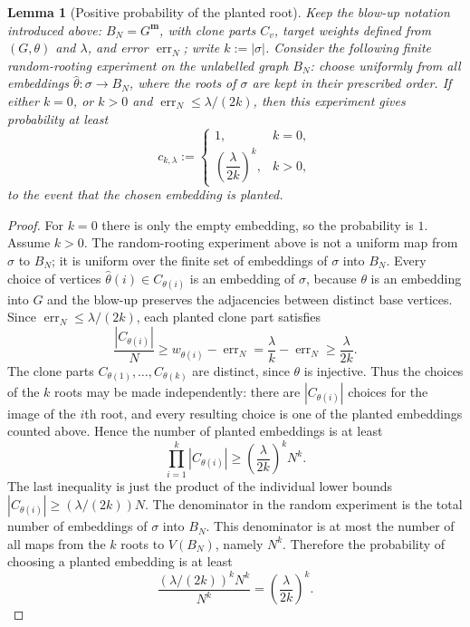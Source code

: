 \documentclass[11pt]{article}
\newtheorem{lemma}[lemma]{Lemma}
\theoremstyle{definition}
\begin{document}
\begin{lemma}[Positive probability of the planted root]\label{lem:planted-mass}
Keep the blow-up notation introduced above: $B_N=G^{\mathbf m}$, with clone
parts $C_v$, target weights defined from $(G,\theta)$ and $\lambda$, and error
$\operatorname{err}_N$; write $k:=|\sigma|$.  Consider the following finite
random-rooting experiment on the unlabelled graph $B_N$: choose uniformly from
all embeddings $\widehat\theta:\sigma\to B_N$, where the roots of
$\sigma$ are kept in their prescribed order.  If either $k=0$, or $k>0$ and
$\operatorname{err}_N\le\lambda/(2k)$, then this experiment gives
probability at least
\[
  c_{k,\lambda}:=
  \begin{cases}
    1, & k=0,\\[1mm]
    \left(\dfrac{\lambda}{2k}\right)^k, & k>0,
  \end{cases}
\]
to the event that the chosen embedding is planted.
\end{lemma}

\begin{proof}
For $k=0$ there is only the empty embedding, so the probability is $1$.  Assume
$k>0$.  The random-rooting experiment above is not a uniform map from $\sigma$ to $B_N$;
it is uniform over the finite set of embeddings of $\sigma$ into
$B_N$.  Every choice of vertices
$\widehat\theta(i)\in C_{\theta(i)}$ is an embedding of $\sigma$,
because $\theta$ is an embedding into $G$ and the blow-up preserves the
adjacencies between distinct base vertices.  Since
$\operatorname{err}_N\le\lambda/(2k)$, each planted clone part satisfies
\[
  \frac{|C_{\theta(i)}|}{N}
  \ge
  w_{\theta(i)}-\operatorname{err}_N
  =
  \frac{\lambda}{k}-\operatorname{err}_N
  \ge
  \frac{\lambda}{2k}.
\]
The clone parts $C_{\theta(1)},\ldots,C_{\theta(k)}$ are distinct, since
$\theta$ is injective.  Thus the choices of the $k$ roots may be made
independently: there are $|C_{\theta(i)}|$ choices for the image of the
$i$th root, and every resulting choice is one of the planted embeddings counted above.
Hence the number of planted embeddings is at least
\[
  \prod_{i=1}^k |C_{\theta(i)}|
  \ge
  \left(\frac{\lambda}{2k}\right)^k N^k .
\]
The last inequality is just the product of the individual lower bounds
$|C_{\theta(i)}|\ge(\lambda/(2k))N$.
The denominator in the random experiment is the total number of embeddings of
$\sigma$ into $B_N$.  This denominator is at most the number of all maps from the
$k$ roots to $V(B_N)$, namely $N^k$.  Therefore
the probability of choosing a planted embedding is at least
\[
  \frac{(\lambda/(2k))^kN^k}{N^k}
  =
  \left(\frac{\lambda}{2k}\right)^k .
\]
\end{proof}
\end{document}
